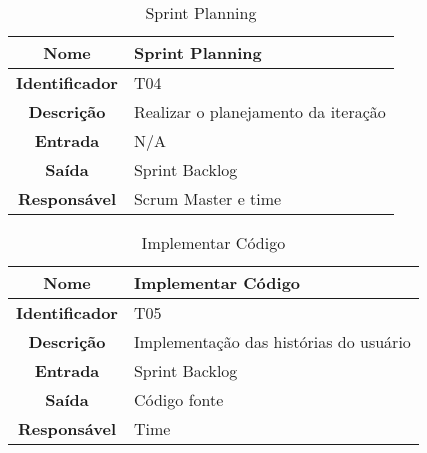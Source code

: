 {             \begin{table}[H]
                \centering
                \caption{Sprint Planning }
                \begin{tabular}{c|p{10cm}}
                    \hline
                    \textbf{Nome}            & Sprint Planning \\
                    \hline
                    \textbf{Identificador} & T04\\ 
                    \hline
                    \textbf{Descrição}   & Realizar o planejamento da iteração\\ 
                    \hline
                    \textbf{Entrada}           & N/A\\
                    \hline
                    \textbf{Saída}            & Sprint Backlog\\
                    \hline
                    \textbf{Responsável}            & Scrum Master e  time \\
                    \hline                    
                \end{tabular}
            \end{table}

             \begin{table}[H]
                \centering
                \caption{Implementar Código}
                \begin{tabular}{c|p{10cm}}
                    \hline
                    \textbf{Nome}            & Implementar Código\\
                    \hline
                    \textbf{Identificador} & T05\\ 
                    \hline
                    \textbf{Descrição}   & Implementação das histórias do usuário\\ 
                    \hline
                    \textbf{Entrada}           & Sprint Backlog\\
                    \hline
                    \textbf{Saída}            &  Código fonte\\
                    \hline
                    \textbf{Responsável}            & Time\\
                    \hline                    
                \end{tabular}
            \end{table}

}

